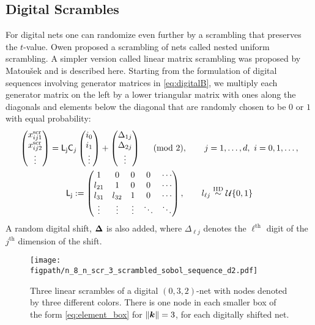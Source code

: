 \documentclass{svproc}
\newcommand{\figpath}{Figures}
\begin{document}
\subsection{Digital Scrambles} \label{sec:scrambles}
For digital nets one can randomize even further by a scrambling that preserves the $t$-value.  Owen \cite{Owe95} proposed a scrambling of nets called nested uniform scrambling.  A simpler version called linear matrix scrambling was proposed by Matou\v{s}ek \cite{Mat98} and is described here.  Starting from the formulation of digital sequences involving generator matrices in \ref{eq:digitalB}, we multiply each generator matrix on the left by a lower triangular matrix with ones along the diagonals and elements below the diagonal that are randomly chosen to be $0$ or $1$ with equal probability:
\begin{subequations} \label{eq:scr_lattice}
\begin{gather} \label{eq:digitalscr}
	\begin{pmatrix} x^{\text{scr}}_{ij1} \\ x^{\text{scr}}_{ij2} \\ \vdots \end{pmatrix}
	= \mathsf{L_j} \mathsf{C}_j \begin{pmatrix} i_0 \\ i_1 \\ \vdots \end{pmatrix} + \begin{pmatrix} \Delta_{1j} \\ \Delta_{2j} \\ \vdots \end{pmatrix} \quad \pmod{2}, \qquad j = 1,\ldots, d, \ i = 0, 1, \ldots, \\
	\mathsf{L_j} :=
	\begin{pmatrix}
		1 & 0 & 0 & 0 & \cdots \\
		l_{21} & 1 & 0 & 0 & \cdots \\
		l_{31} & l_{32} & 1 & 0 & \cdots \\
		\vdots & \vdots & \vdots & \ddots & \ddots
	\end{pmatrix}, \qquad l_{\ell j} \overset {\text{IID}}{\sim} {\mathcal{U}}\{0,1\}
\end{gather}
\end{subequations}
A random digital shift, ${\boldsymbol{\Delta}}$ is also added, where $\Delta_{\ell j}$ denotes the $\ell^{\text{th}}$ digit of the $j^{\text{th}}$ dimension of the shift.

\begin{figure}
	\centering
	\texttt{[image: \\figpath/n\_8\_n\_scr\_3\_scrambled\_sobol\_sequence\_d2.pdf]}
	\caption{Three linear scrambles of a digital $(0,3,2)$-net with nodes denoted by three different colors.  There is one node in each smaller box of the form \eqref{eq:element_box} for $\lVert {\boldsymbol{k}} \rVert = 3$, for each digitally shifted net. \label{fig:scrambled_net}}
\end{figure}
\end{document}
